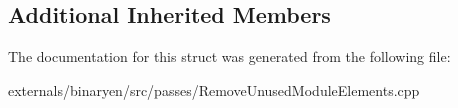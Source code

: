 \subsection*{Additional Inherited Members}


The documentation for this struct was generated from the following file\+:\begin{DoxyCompactItemize}
\item 
externals/binaryen/src/passes/Remove\+Unused\+Module\+Elements.\+cpp\end{DoxyCompactItemize}
